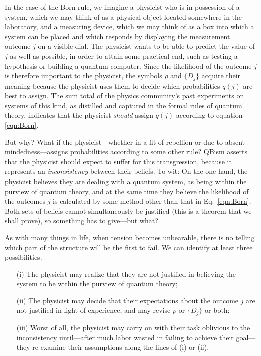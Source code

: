 \documentclass[%
 reprint,superscriptaddress,
 amsmath,amssymb,
 aps,twocolumn,pra
]{revtex4-1}
\newcommand{\tit}[1]{\textit{#1}}
\begin{document}
In the case of the Born rule, we imagine a physicist who is in possession of a system, which we may think of as a physical object located somewhere in the laboratory, and a measuring device, which we may think of as a box into which a system can be placed and which responds by displaying the measurement outcome $j$ on a visible dial. The physicist wants to be able to predict the value of $j$ as well as possible, in order to attain some practical end, such as testing a hypothesis or building a quantum computer. Since the likelihood of the outcome $j$ is therefore important to the physicist, the symbols $\rho$ and $\{ D_j \}$ acquire their meaning because the physicist uses them to decide which probabilities $q(j)$ are best to assign. The sum total of the physics community's past experiments on systems of this kind, as distilled and captured in the formal rules of quantum theory, indicates that the physicist \tit{should} assign $q(j)$ according to equation \eqref{eqn:Born}.

But why? What if the physicist---whether in a fit of rebellion or due to absent-mindedness---assigns probabilities according to some other rule?  QBism asserts that the physicist should expect to suffer for this transgression, because it represents an \tit{inconsistency} between their beliefs. To wit: On the one hand, the physicist believes they are dealing with a quantum system, as being within the purview of quantum theory, and at the same time they believe the likelihood of the outcomes $j$ is calculated by some method other than that in Eq.\ \eqref{eqn:Born}. Both sets of beliefs cannot simultaneously be justified (this is a theorem that we shall prove), so something has to give---but what?

As with many things in life, when tension becomes unbearable, there is no telling which part of the structure will be the first to fail. We can identify at least three possibilities:
\begin{itemize}
\item[(i)]
The physicist may realize that they are not justified in believing the system to be within the purview of quantum theory;
\item[(ii)]
The physicist may decide that their expectations about the outcome $j$ are not justified in light of experience, and may revise $\rho$ or $\{ D_j \}$ or both;
\item[(iii)]
Worst of all, the physicist may carry on with their task oblivious to the inconsistency until---after much labor wasted in failing to achieve their goal---they re-examine their assumptions along the lines of (i) or (ii).
\end{itemize}
\end{document}
